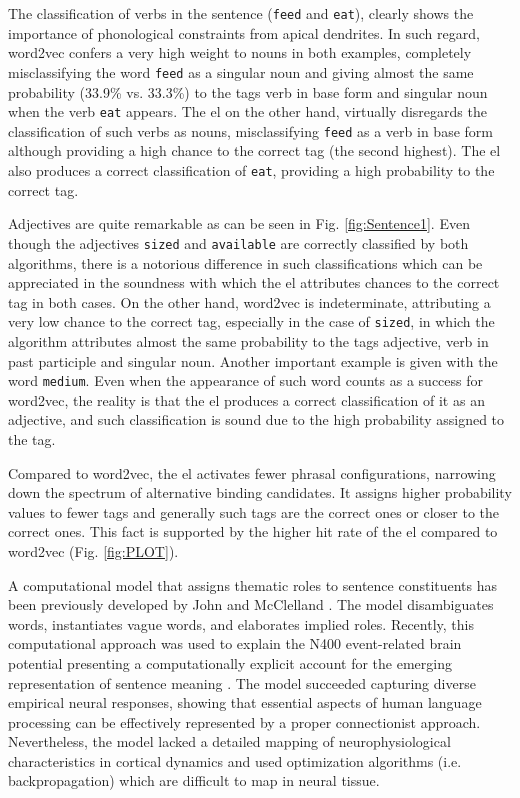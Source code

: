 {The classification of verbs in the sentence (\texttt{feed} and \texttt{eat}), clearly shows the importance of phonological constraints from apical dendrites. In such regard, word2vec confers a very high weight to nouns in both examples, completely misclassifying the word \texttt{feed} as a singular noun and giving almost the same probability (33.9\% vs. 33.3\%) to the tags verb in base form and singular noun when the verb \texttt{eat} appears. The \gls{el} on the other hand, virtually disregards the classification of such verbs as nouns, misclassifying \texttt{feed} as a verb in base form although providing a high chance to the correct tag (the second highest). The \gls{el} also produces a correct classification of \texttt{eat}, providing a high probability to the correct tag.

Adjectives are quite remarkable as can be seen in Fig. \ref{fig:Sentence1}. Even though the adjectives \texttt{sized} and \texttt{available} are correctly classified by both algorithms, there is a notorious difference in such classifications which can be appreciated in the soundness with which the \gls{el} attributes chances to the correct tag in both cases. On the other hand, word2vec is  indeterminate, attributing a very low chance to the correct tag, especially in the case of \texttt{sized}, in which the algorithm attributes almost the same probability to the tags adjective, verb in past participle and singular noun. Another important example is given with the word \texttt{medium}. Even when the appearance of such word counts as a success for word2vec, the reality is that the \gls{el} produces a correct classification of it as an adjective, and such classification is sound due to the high probability assigned to the tag.

Compared to word2vec, the \gls{el} activates fewer phrasal configurations, narrowing down the spectrum of alternative binding candidates. It assigns higher probability values to fewer tags and generally such tags are the correct ones or closer to the correct ones. This fact is supported by the higher hit rate of the \gls{el} compared to word2vec (Fig. \ref{fig:PLOT}).

A computational model that assigns thematic roles to sentence constituents has been previously developed by John and McClelland \cite{STJOHN1990217}. The model disambiguates words, instantiates vague words, and elaborates implied roles. Recently, this computational approach was used to explain the N400 event-related brain potential presenting a computationally explicit account for the emerging representation of sentence meaning \cite{rabovsky_modelling_2018}. The model succeeded capturing diverse empirical neural responses, showing that essential aspects of human language processing can be effectively represented by a proper connectionist approach. Nevertheless, the model lacked a detailed mapping of neurophysiological characteristics in cortical dynamics and used optimization algorithms (i.e. backpropagation) which are difficult to map in neural tissue.

}
